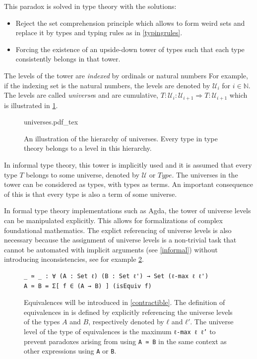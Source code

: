 \documentclass[12pt,a4paper,twoside,xetex]{book} %
\newcommand{\keyword}[1]{\emph{#1}\index{#1}}
\newcommand{\incfig}[1]{%
    \def\svgwidth{0.6\columnwidth}
    {#1.pdf_tex}
}
\begin{document}
This paradox is solved in type theory with the solutions:

\begin{itemize}
 \item Reject the set comprehension principle which allows to form weird sets and replace it by types and typing rules as in \cref{typingrules}.
 \item  Forcing the existence of an upside-down tower of types such that each type consistently belongs in that tower. 
 
\end{itemize}
 
The levels of the 
tower are \keyword{indexed} by ordinals or natural numbers For example, if the indexing set is the natural numbers, the levels are denoted by $\mathcal{U}_i$ for $i\in \mathbb{N}$. The levels are called \keyword{universe}s and are cumulative, $T: 
\mathcal{U}_i:\mathcal{U}_{i+1} \Rightarrow T : \mathcal{U}_{i+1}$ which is illustrated in \cref{universefig}.

\begin{figure}\label{universefig}
\centering
\incfig{universes}
\caption{An illustration of the hierarchy of universes. Every type in type theory belongs to a level in this hierarchy.}
\end{figure}



In informal type theory, this tower is implicitly used and it is assumed that 
every type $T$ belongs to some universe, denoted by $\mathcal{U}$ or $Type$. The 
universes in the tower can be considered as types, with types as terms. An 
important consequence of this is that every type is also a term of some 
universe.

In formal type theory implementations such as Agda, the tower of universe levels 
can be manipulated explicitly. This allows for formalizations of 
complex foundational mathematics. The explict referencing of universe levels is also necessary because the 
assignment of universe levels is a non-trivial task that cannot be automated with implicit arguments (see \cref{informal})
without introducing inconsistencies, see for example \cref{AgdaEquivalences}.

\begin{figure}\label{AgdaEquivalences}
\centering
\begin{BVerbatim}
_ ≃ _ : ∀ (A : Set ℓ) (B : Set ℓ') → Set (ℓ-max ℓ ℓ')
A ≃ B = Σ[ f ∈ (A → B) ] (isEquiv f)
\end{BVerbatim}

\caption{Equivalences will be introduced in \cref{contractible}. The definition 
of equivalences in \cite{Moertberg2018} is defined by explicitly referencing the 
universe levels of the types $A$ and $B$, respectively denoted by $ℓ$ and $ℓ'$. 
The universe level of the type of equivalences is the maximum \texttt{ℓ-max ℓ ℓ'} 
to prevent paradoxes arising from using \texttt{A ≃ B} in the same context as 
other expressions using \texttt{A} or \texttt{B}.}
\end{figure}
\end{document}

